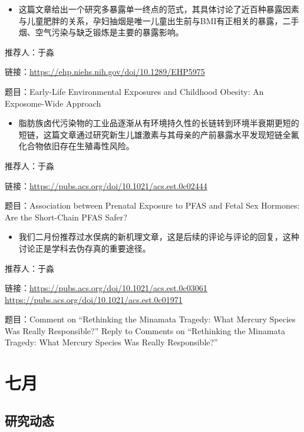\documentclass[
]{book}
\providecommand{\tightlist}{%
  \setlength{\itemsep}{0pt}\setlength{\parskip}{0pt}}
\begin{document}
\begin{itemize}
\tightlist
\item
  这篇文章给出一个研究多暴露单一终点的范式，其具体讨论了近百种暴露因素与儿童肥胖的关系，孕妇抽烟是唯一儿童出生前与BMI有正相关的暴露，二手烟、空气污染与缺乏锻炼是主要的暴露影响。
\end{itemize}

推荐人：于淼

链接：\url{https://ehp.niehs.nih.gov/doi/10.1289/EHP5975}

题目：Early-Life Environmental Exposures and Childhood Obesity: An Exposome-Wide Approach

\begin{itemize}
\tightlist
\item
  脂肪族卤代污染物的工业品逐渐从有环境持久性的长链转到环境半衰期更短的短链，这篇文章通过研究新生儿雄激素与其母亲的产前暴露水平发现短链全氟化合物依旧存在生殖毒性风险。
\end{itemize}

推荐人：于淼

链接：\url{https://pubs.acs.org/doi/10.1021/acs.est.0c02444}

题目：Association between Prenatal Exposure to PFAS and Fetal Sex Hormones: Are the Short-Chain PFAS Safer?

\begin{itemize}
\tightlist
\item
  我们二月份推荐过水俣病的新机理文章，这是后续的评论与评论的回复，这种讨论正是学科去伪存真的重要途径。
\end{itemize}

推荐人：于淼

链接：\url{https://pubs.acs.org/doi/10.1021/acs.est.0c03061} \url{https://pubs.acs.org/doi/10.1021/acs.est.0c01971}

题目：Comment on ``Rethinking the Minamata Tragedy: What Mercury Species Was Really Responsible?'' Reply to Comments on ``Rethinking the Minamata Tragedy: What Mercury Species Was Really Responsible?''

\hypertarget{ux4e03ux6708-2}{%
\section*{七月}\label{ux4e03ux6708-2}}

\hypertarget{ux7814ux7a76ux52a8ux6001-32}{%
\subsection*{研究动态}\label{ux7814ux7a76ux52a8ux6001-32}}
\end{document}
